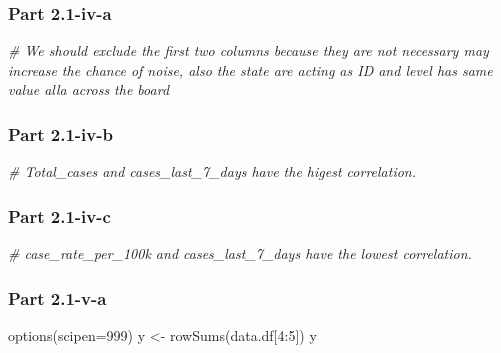 \documentclass[
]{article}
\newenvironment{Shaded}{\begin{snugshade}}{\end{snugshade}}
\newcommand{\AttributeTok}[1]{\textcolor[rgb]{0.77,0.63,0.00}{#1}}
\newcommand{\CommentTok}[1]{\textcolor[rgb]{0.56,0.35,0.01}{\textit{#1}}}
\newcommand{\DecValTok}[1]{\textcolor[rgb]{0.00,0.00,0.81}{#1}}
\newcommand{\FunctionTok}[1]{\textcolor[rgb]{0.00,0.00,0.00}{#1}}
\newcommand{\NormalTok}[1]{#1}
\newcommand{\OtherTok}[1]{\textcolor[rgb]{0.56,0.35,0.01}{#1}}
\newcommand{\SpecialCharTok}[1]{\textcolor[rgb]{0.00,0.00,0.00}{#1}}
\begin{document}
\hypertarget{part-2.1-iv-a}{%
\subsubsection{Part 2.1-iv-a}\label{part-2.1-iv-a}}

\begin{Shaded}
\begin{Highlighting}[]
\CommentTok{\# We should exclude the first two columns because they are not necessary may increase the chance of noise, also the state are acting as ID and level has same value alla across the board}
\end{Highlighting}
\end{Shaded}

\hypertarget{part-2.1-iv-b}{%
\subsubsection{Part 2.1-iv-b}\label{part-2.1-iv-b}}

\begin{Shaded}
\begin{Highlighting}[]
\CommentTok{\# Total\_cases and cases\_last\_7\_days have the higest correlation.}
\end{Highlighting}
\end{Shaded}

\hypertarget{part-2.1-iv-c}{%
\subsubsection{Part 2.1-iv-c}\label{part-2.1-iv-c}}

\begin{Shaded}
\begin{Highlighting}[]
\CommentTok{\# case\_rate\_per\_100k and cases\_last\_7\_days have the lowest correlation.}
\end{Highlighting}
\end{Shaded}

\hypertarget{part-2.1-v-a}{%
\subsubsection{Part 2.1-v-a}\label{part-2.1-v-a}}

\begin{Shaded}
\begin{Highlighting}[]
\FunctionTok{options}\NormalTok{(}\AttributeTok{scipen=}\DecValTok{999}\NormalTok{)}
\NormalTok{y }\OtherTok{\textless{}{-}} \FunctionTok{rowSums}\NormalTok{(data.df[}\DecValTok{4}\SpecialCharTok{:}\DecValTok{5}\NormalTok{])}
\NormalTok{y}
\end{Highlighting}
\end{Shaded}
\end{document}
